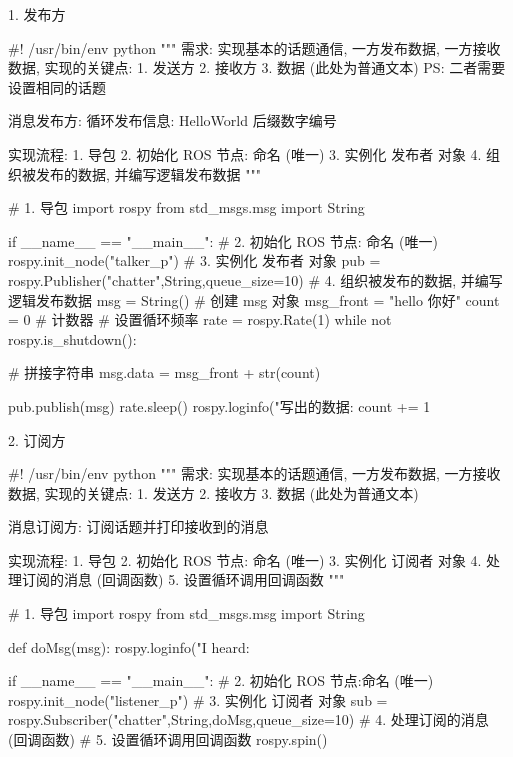 \documentclass[openany, fontset=windowsold]{ctexbook}
\theoremstyle{kaiti}
\theoremstyle{normal}
\begin{document}
1. 发布方

\begin{python}
  #! /usr/bin/env python
  """
      需求: 实现基本的话题通信, 一方发布数据, 一方接收数据, 
          实现的关键点:
          1. 发送方
          2. 接收方
          3. 数据 (此处为普通文本)
          PS: 二者需要设置相同的话题

      消息发布方:
          循环发布信息: HelloWorld 后缀数字编号

      实现流程:
          1. 导包 
          2. 初始化 ROS 节点: 命名 (唯一)
          3. 实例化 发布者 对象
          4. 组织被发布的数据, 并编写逻辑发布数据
  """

  # 1. 导包 
  import rospy
  from std_msgs.msg import String

  if __name__ == "__main__":
      # 2. 初始化 ROS 节点: 命名 (唯一)
      rospy.init_node("talker_p")
      # 3. 实例化 发布者 对象
      pub = rospy.Publisher("chatter",String,queue_size=10)
      # 4. 组织被发布的数据, 并编写逻辑发布数据
      msg = String()  # 创建 msg 对象
      msg_front = "hello 你好"
      count = 0  # 计数器 
      # 设置循环频率
      rate = rospy.Rate(1)
      while not rospy.is_shutdown():

          # 拼接字符串
          msg.data = msg_front + str(count)

          pub.publish(msg)
          rate.sleep()
          rospy.loginfo("写出的数据:%
          count += 1
\end{python}

2. 订阅方

\begin{python}
  #! /usr/bin/env python
  """
      需求: 实现基本的话题通信, 一方发布数据, 一方接收数据, 
          实现的关键点:
          1. 发送方
          2. 接收方
          3. 数据 (此处为普通文本)

      消息订阅方:
          订阅话题并打印接收到的消息

      实现流程:
          1. 导包 
          2. 初始化 ROS 节点: 命名 (唯一)
          3. 实例化 订阅者 对象
          4. 处理订阅的消息 (回调函数)
          5. 设置循环调用回调函数
  """

  # 1. 导包 
  import rospy
  from std_msgs.msg import String

  def doMsg(msg):
      rospy.loginfo("I heard:%

  if __name__ == "__main__":
      # 2. 初始化 ROS 节点:命名 (唯一)
      rospy.init_node("listener_p")
      # 3. 实例化 订阅者 对象
      sub = rospy.Subscriber("chatter",String,doMsg,queue_size=10)
      # 4. 处理订阅的消息 (回调函数)
      # 5. 设置循环调用回调函数
      rospy.spin()
\end{python}
\end{document}
